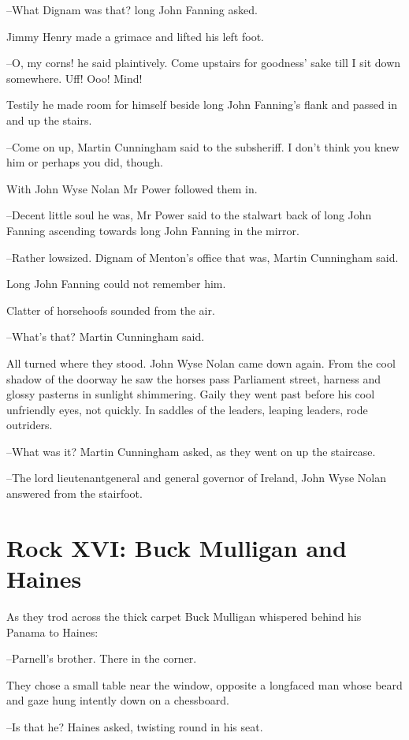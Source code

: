 --What Dignam was that?
long John Fanning asked.

Jimmy Henry made a grimace and lifted his left foot.

--O, my corns!
he said plaintively.
Come upstairs for goodness' sake till I sit down somewhere.
Uff!
Ooo!
Mind!

Testily he made room for himself
beside long John Fanning's flank
and
passed in and up the stairs.

--Come on up,
Martin Cunningham said to the subsheriff.
I don't think you
knew him
or perhaps you did, though.

With John Wyse Nolan
Mr Power followed them in.

--Decent little soul he was,
Mr Power said
to the stalwart back of long
John Fanning
ascending towards long John Fanning in the mirror.

--Rather lowsized.
Dignam of Menton's office that was,
Martin Cunningham
said.

Long John Fanning could not remember him.%

Clatter of horsehoofs sounded from the air.

--What's that? Martin Cunningham said.

All turned where they stood.
John Wyse Nolan came down again.
From the
cool shadow of the doorway
he saw the horses pass Parliament street,
harness and glossy pasterns in sunlight shimmering.
Gaily they went past
before his cool unfriendly eyes,
not quickly.
In saddles of the leaders,
leaping leaders,
rode outriders.

--What was it?
Martin Cunningham asked,
as they went on up the staircase.

--The lord lieutenantgeneral and general governor of Ireland,
John Wyse Nolan answered from the stairfoot.


\section*{Rock XVI: Buck Mulligan and Haines}


As they trod across the thick carpet
Buck Mulligan whispered behind
his Panama to Haines:

--Parnell's brother.
There in the corner.

They chose a small table near the window,
opposite a longfaced man
whose beard and gaze hung intently down on a chessboard.

--Is that he?
Haines asked,
twisting round in his seat.

